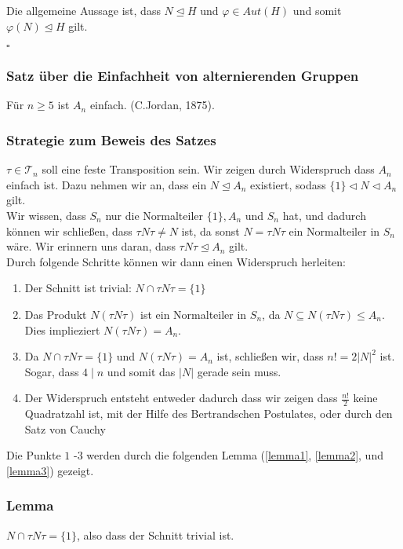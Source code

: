 \documentclass[12pt, german]{article}
\newcommand{\bewiesen}{
	
	\begin{flushright}
		$\square$  \\
\end{flushright}}
\begin{document}
	Die allgemeine Aussage ist, dass $N \trianglelefteq H$ und $\varphi \in Aut(H)$ und somit $\varphi(N) \trianglelefteq H$ gilt. 
	\bewiesen
	
	\subsubsection{Satz über die Einfachheit von alternierenden Gruppen}
	Für $n \geq 5$ ist $A_n$ einfach. (C.Jordan, 1875).
	
	\subsubsection{Strategie zum Beweis des Satzes}
	$\tau \in \mathcal T_n$ soll eine feste Transposition sein. Wir zeigen durch Widerspruch dass $A_n$ einfach ist. Dazu nehmen wir an, dass ein $N \trianglelefteq A_n$ existiert, sodass $\{1\} \triangleleft N \triangleleft A_n$ gilt.  \\
	
	Wir wissen, dass $S_n$ nur die Normalteiler $\{1\}, A_n$ und $S_n$ hat, und dadurch können wir schließen, dass $\tau N\tau \not = N$ ist, da sonst $N = \tau N \tau $ ein Normalteiler in $S_n$ wäre. Wir erinnern uns daran, dass $\tau N \tau \trianglelefteq A_n$ gilt. \\
	Durch folgende Schritte können wir dann einen Widerspruch herleiten: 
	
	\begin{enumerate}[label=\arabic*.]
		\item Der Schnitt ist trivial: $N \cap \tau N \tau = \{1\}$
		\item Das Produkt $N(\tau N \tau)$ ist ein Normalteiler in $S_n$, da $N \subseteq N(\tau N \tau) \leq A_n$. \\ 
		Dies implieziert $N(\tau N \tau) = A_n$.
		\item Da $N\cap \tau N \tau =  \{1\}$ und $N(  \tau N \tau ) = A_n$ ist, schließen wir, dass $n! = 2 |N|^2$ ist. Sogar, dass $4 \mid n$ und somit das $|N|$ gerade sein muss. 
		\item Der Widerspruch entsteht entweder dadurch dass wir zeigen dass $\frac{n!}{2}$ keine Quadratzahl ist, mit der Hilfe des Bertrandschen Postulates, oder durch den Satz von Cauchy
	\end{enumerate}
	Die Punkte $1$ -$3$ werden durch die folgenden Lemma (\ref{lemma1}, \ref{lemma2}, und \ref{lemma3}) gezeigt. 
	
	\subsubsection{Lemma \label{lemma1}}
	$N \cap \tau N \tau = \{1\}$, also dass der Schnitt trivial ist.
\end{document}
